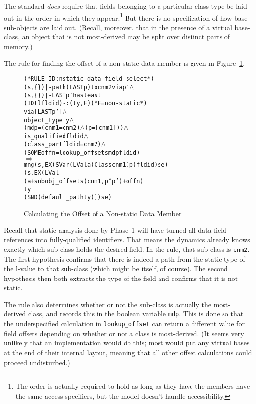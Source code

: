 \documentclass[11pt]{article}
\newcommand{\lbr}{\texttt{\{}}
\newcommand{\rbr}{\texttt{\}}}
\begin{document}
The standard \emph{does} require that fields belonging to a particular
class type be laid out in the order in which they appear.\footnote{The
  order is actually required to hold as long as they have the members
  have the same access-specifiers, but the model doesn't handle
  accessibility.}  But there is no specification of how base
sub-objects are laid out.  (Recall, moreover, that in the presence of
a virtual base-class, an object that is not most-derived may be split
over distinct parts of memory.)

The rule for finding the offset of a non-static data member is given
in Figure~\ref{fig:nstatic-data-field-select}.
\begin{figure}
\begin{center}
\begin{minipage}{\textwidth}
%
\begin{alltt}
(* RULE-ID: nstatic-data-field-select *)
     (s,\lbr\rbr) |- path (LAST p) to cnm2 via p' \(\land\)
     (s,\lbr\rbr) |- LAST p' has least
                 (IDtl fldid) -: (ty, F)  (* F = non-static *)
                 via [LAST p'] \(\land\)
     object_type ty \(\land\)
     (mdp = (cnm1 = cnm2) \(\land\) (p = [cnm1])) \(\land\)
     is_qualified fldid \(\land\)
     (class_part fldid = cnm2) \(\land\)
     (SOME offn = lookup_offset s mdp fldid)
   \(\Rightarrow\)
     mng (s, EX (SVar (LVal a (Class cnm1) p) fldid) se)
         (s, EX (LVal
                  (a + subobj_offset s (cnm1, p ^ p') + offn)
                  ty
                  (SND (default_path ty))) se)
\end{alltt}
\end{minipage}
\end{center}
\caption{Calculating the Offset of a Non-static Data Member}
\label{fig:nstatic-data-field-select}
\end{figure}
Recall that static analysis done by Phase~1 will have turned all data
field references into fully-qualified identifiers.  That means the
dynamics already knows exactly which sub-class holds the desired
field.  In the rule, that sub-class is \texttt{cnm2}.  The first
hypothesis confirms that there is indeed a path from the static type
of the l-value to that sub-class (which might be itself, of course).
The second hypothesis then both extracts the type of the field and
confirms that it is not static.

The rule also determines whether or not the sub-class is actually the
most-derived class, and records this in the boolean variable
\texttt{mdp}.  This is done so that the underspecified calculation in
\texttt{lookup_offset} can return a different value for field offsets
depending on whether or not a class is most-derived.  (It seems very
unlikely that an implementation would do this; most would put any
virtual bases at the end of their internal layout, meaning that all
other offset calculations could proceed undisturbed.)
\end{document}
